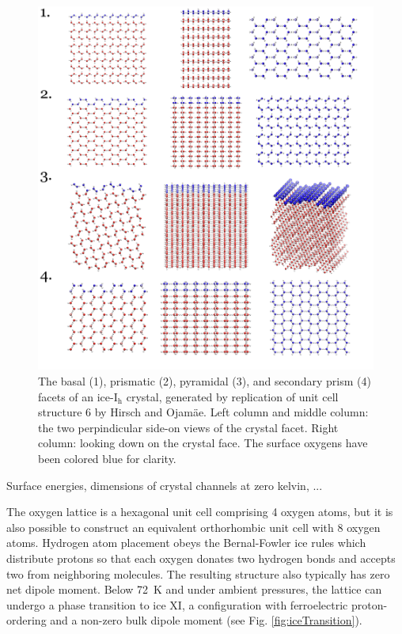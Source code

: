\begin{figure}
\includegraphics[width=1.0\linewidth]{Figures/surfMorph}
\caption{\label{fig:surfMorph}The basal (1), prismatic (2), pyramidal
  (3), and secondary prism (4) facets of an ice-I$_\mathrm{h}$
  crystal, generated by replication of unit cell structure 6 by Hirsch
  and Ojam\"{a}e. Left column and middle column: the two perpindicular
  side-on views of the crystal facet. Right column: looking down on
  the crystal face. The surface oxygens have been colored blue for
  clarity.}
\end{figure}

Surface energies, dimensions of crystal channels at zero kelvin, ...

The oxygen lattice is a hexagonal unit cell comprising 4 oxygen atoms,
but it is also possible to construct an equivalent orthorhombic unit
cell with 8 oxygen atoms.\cite{Hirsch2004} Hydrogen atom placement
obeys the Bernal-Fowler ice rules which distribute protons so that
each oxygen donates two hydrogen bonds and accepts two from
neighboring molecules.\cite{Bernal1933} The resulting structure also
typically has zero net dipole moment. Below 72~K and under ambient
pressures, the lattice can undergo a phase transition to ice XI, a
configuration with ferroelectric proton-ordering and a non-zero bulk
dipole moment (see Fig. \ref{fig:iceTransition}).

